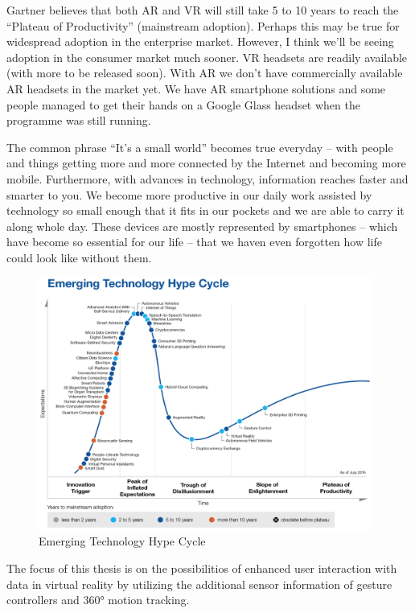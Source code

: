 Gartner believes that both AR and VR will still take 5 to 10 years to reach the “Plateau of Productivity” (mainstream adoption). Perhaps this may be true for widespread adoption in the enterprise market. However, I think we’ll be seeing adoption in the consumer market much sooner. VR headsets are readily available (with more to be released soon). With AR we don’t have commercially available AR headsets in the market yet. We have AR smartphone solutions and some people managed to get their hands on a Google Glass headset when the programme was still running.



The common phrase “It’s a small world” becomes true everyday – with people and things getting more and more connected by the Internet and becoming more mobile. Furthermore, with advances in technology, information reaches faster and smarter to you. We become more productive in our daily work assisted by technology so small enough that it fits in our pockets and we are able to carry it along whole day. These devices are mostly represented by smartphones – which have become so essential for our life – that we haven even forgotten how life could look like without them.





\begin{figure}[h]
	\begin{center}
		\includegraphics[width=11cm]{03_Figures/03_Gartner/Gartner_EmergingTech2015.png}
		\caption[Emerging Technology Hype Cycle]{Emerging Technology Hype Cycle \citep{Gartner2015b}}
		\label{fig:dsrcycle}
	\end{center}
\end{figure}


The focus of this thesis is on the possibilitios of enhanced user interaction with data in virtual reality by utilizing the additional sensor information of gesture controllers and 360° motion tracking.

